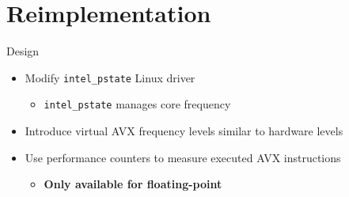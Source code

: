 \section{Reimplementation}
\begin{frame}[t]{Design}
	\begin{itemize}
		\item Modify \texttt{intel\_pstate} Linux driver
		\begin{itemize}
			\item \texttt{intel\_pstate} manages core frequency
		\end{itemize}
		\item Introduce virtual AVX frequency levels similar to hardware levels
		\item Use performance counters to measure executed AVX instructions
		\begin{itemize}
			\item \textbf{Only available for floating-point}
		\end{itemize}
	\end{itemize}
\end{frame}


